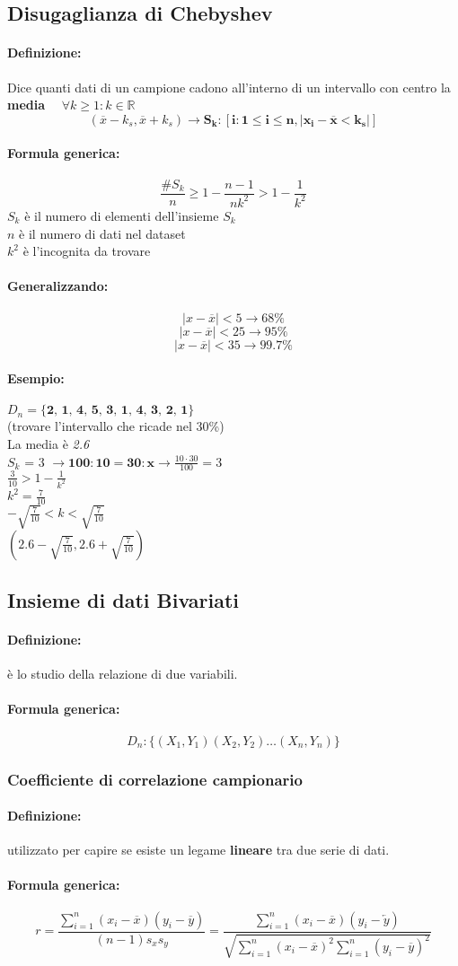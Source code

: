 \documentclass[]{article}
\newcommand{\definizione}{\paragraph{Definizione:}}
\newcommand{\formula}{\paragraph{Formula generica:}}
\begin{document}
    \subsection{Disugaglianza di Chebyshev}
    \definizione Dice quanti dati di un campione cadono all'interno di un intervallo con centro la \textbf{media} $\quad \forall k \geq 1 : k \in \mathbb{R}$
    \[ (\overline{x} - k_s, \overline{x} + k_s) \longrightarrow \boldsymbol{S_k : [i : 1 \leq i \leq n, |x_i - \overline{x} < k_s|]} \]
    \formula 
    \[ \frac{\#S_k}{n} \geq 1 - \frac{n - 1}{nk^2} > 1 - \frac{1}{k^2} \]
    $S_k$ è il numero di elementi dell'insieme $S_k$ \\
    $n$ è il numero di dati nel dataset \\
    $k^2$ è l'incognita da trovare
    \paragraph{Generalizzando:}
    \[ |x - \overline{x}| < 5 \longrightarrow 68\% \]
    \[ |x - \overline{x}| < 25 \longrightarrow 95\% \]
    \[ |x - \overline{x}| < 35 \longrightarrow 99.7\% \]

    \paragraph{Esempio:} $D_n = \textbf{\{2, 1, 4, 5, 3, 1, 4, 3, 2, 1\}}$ \\
    (trovare l'intervallo che ricade nel 30\%) \\
    La media è \textit{2.6} \\
    $S_k$ = 3 $\longrightarrow \boldsymbol{100 : 10 = 30 : x} \longrightarrow \frac{10 \cdot 30}{100} = 3 $ \\
    $\frac{3}{10} > 1 - \frac{1}{k^2}$ \\
    $k^2 = \frac{7}{10}$ \\
    $-\sqrt{\frac{7}{10}} < k < \sqrt{\frac{7}{10}}$ \\
    $(2.6 - \sqrt{\frac{7}{10}}, 2.6 + \sqrt{\frac{7}{10}}) $


    \subsection{Insieme di dati Bivariati}
    \definizione è lo studio della relazione di due variabili.
    \formula \[ D_n : \{(X_1, Y_1) (X_2, Y_2) \ldots (X_n, Y_n)\}\]

    \subsubsection{Coefficiente di correlazione campionario}
    \definizione utilizzato per capire se esiste un legame \textbf{lineare} tra due serie di dati.
    \formula 
    \begin{equation*}
        r = \frac{\sum_{i = 1}^{n}(x_i - \overline{x}) (y_i - \overline{y})}{(n-1) s_x s_y} = \frac{\sum_{i = 1}^{n} (x_i - \overline{x}) (y_i - \overleftarrow{y})}{\sqrt{\sum_{i = 1}^{n} (x_i - \overline{x})^2 \sum_{i = 1}^{n} (y_i - \overline{y})^2}}
    \end{equation*}
\end{document}
